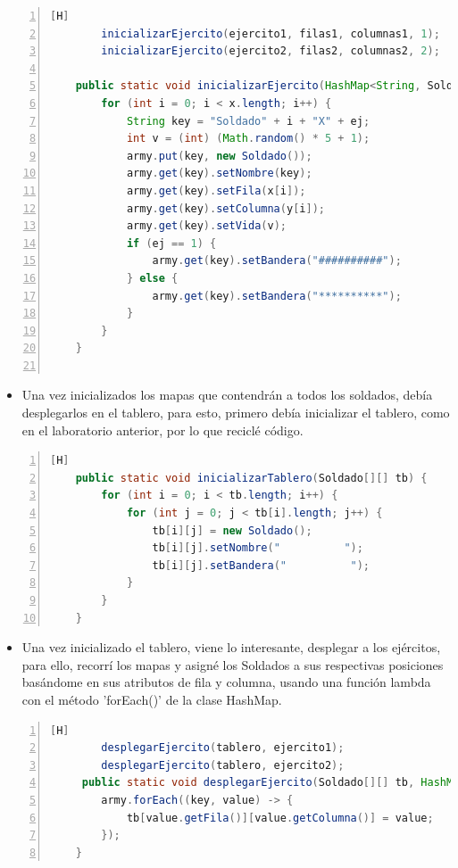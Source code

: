 \documentclass{article}
\begin{document}
	\begin{lstlisting}[language=java,caption={Inicializar mapa}, numbers=left][H]
		inicializarEjercito(ejercito1, filas1, columnas1, 1);
        inicializarEjercito(ejercito2, filas2, columnas2, 2);
            
	public static void inicializarEjercito(HashMap<String, Soldado> army, int[] x, int[] y, int ej) {
        for (int i = 0; i < x.length; i++) {
            String key = "Soldado" + i + "X" + ej;
            int v = (int) (Math.random() * 5 + 1);
            army.put(key, new Soldado());
            army.get(key).setNombre(key);
            army.get(key).setFila(x[i]);
            army.get(key).setColumna(y[i]);
            army.get(key).setVida(v);
            if (ej == 1) {
                army.get(key).setBandera("##########");
            } else {
                army.get(key).setBandera("**********");
            }
        }
    }
    
	\end{lstlisting}
	\begin{itemize}	
		\item Una vez inicializados los mapas que contendrán a todos los soldados, debía desplegarlos en el tablero, para esto, primero debía inicializar el tablero, como en el laboratorio anterior, por lo que reciclé código.
	\end{itemize}
	\begin{lstlisting}[language=java,caption={Inicializar tablero}, numbers=left][H]
	public static void inicializarTablero(Soldado[][] tb) {
        for (int i = 0; i < tb.length; i++) {
            for (int j = 0; j < tb[i].length; j++) {
                tb[i][j] = new Soldado();
                tb[i][j].setNombre("          ");
                tb[i][j].setBandera("          ");
            }
        }
    }
	\end{lstlisting}	
	\begin{itemize}	
		\item Una vez inicializado el tablero, viene lo interesante, desplegar a los ejércitos, para ello, recorrí los mapas y asigné los Soldados a sus respectivas posiciones basándome en sus atributos de fila y columna, usando una función lambda con el método 'forEach()' de la clase HashMap.
	\end{itemize}
	\begin{lstlisting}[language=java,caption={Desplegando a los soldados}, numbers=left][H]
		desplegarEjercito(tablero, ejercito1);
		desplegarEjercito(tablero, ejercito2);
	 public static void desplegarEjercito(Soldado[][] tb, HashMap<String, Soldado> army) {
        army.forEach((key, value) -> {
            tb[value.getFila()][value.getColumna()] = value;
        });
    }
	\end{lstlisting}
\end{document}
